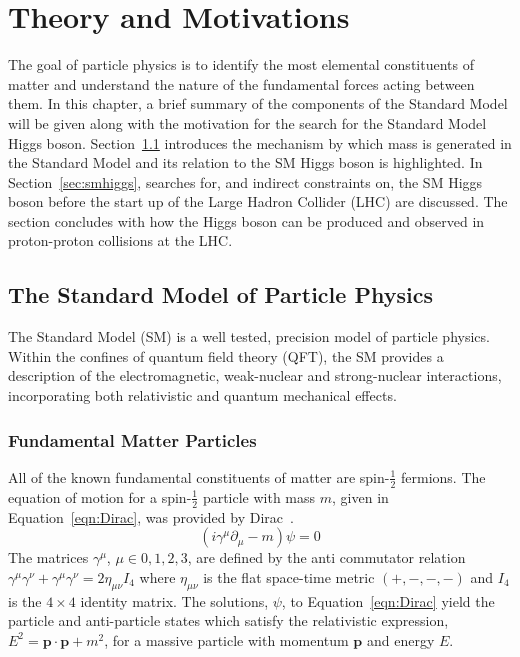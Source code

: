 \chapter{Theory and Motivations}
\label{chap:theory}

The goal of particle physics is to identify 
the most elemental constituents of matter and understand the nature of
the fundamental forces acting between them. In this chapter, a brief summary of 
the components of the Standard Model  will be given along with the motivation for
the search for the Standard Model Higgs boson. 
Section~\ref{sec:sm} introduces the mechanism by which mass is generated in the 
Standard Model and its relation to the SM Higgs boson is highlighted.
In Section~\ref{sec:smhiggs}, 
searches for, and indirect constraints on, the SM Higgs boson before the start up of 
the Large Hadron Collider (LHC) are discussed. The section concludes with 
how the Higgs boson can be produced and observed in proton-proton collisions at the LHC.

\section{The Standard Model of Particle Physics}
\label{sec:sm}

The Standard Model (SM) is  
a well tested, precision model of particle physics. 
Within the confines of quantum field theory (QFT),  
the SM provides a description of the electromagnetic, weak-nuclear
and strong-nuclear interactions, incorporating
both relativistic and quantum mechanical effects.

\subsection{Fundamental Matter Particles}
All of the known fundamental constituents of matter
are spin-$\frac{1}{2}$ fermions. 
The equation of motion for a spin-$\frac{1}{2}$ particle with mass $m$, 
given in Equation~\ref{eqn:Dirac}, was provided by Dirac~\citep{wu}.
\begin{equation}
(i\gamma^{\mu}\partial_{\mu} - m)\psi = 0
\label{eqn:Dirac}
\end{equation}
The matrices $\gamma^{\mu}$, $\mu\in{0,1,2,3}$,  are
defined by the anti commutator relation 
$\gamma^{\mu}\gamma^{\nu}+\gamma^{\mu}\gamma^{\nu} = 2\eta_{\mu\nu}I_{4}$ where
$\eta_{\mu\nu}$ is the flat space-time metric $(+,-,-,-)$ and $I_{4}$ is the $4\times4$
identity matrix.
The solutions, $\psi$, to Equation~\ref{eqn:Dirac} yield the particle and anti-particle
states which satisfy the relativistic expression, 
$E^{2} = \mathbf{p}\cdot\mathbf{p} + m^{2}$, for a 
massive particle with momentum $\mathbf{p}$ and energy $E$.
 
